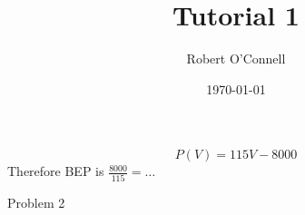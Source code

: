 \documentclass{article}
\title{\textbf{Tutorial 1}}
\author{Robert O'Connell}
\date{\today}
\begin{document}
\maketitle

\begin{problem}
\begin{solution}
	\[
		P(V) = 115V - 8000
	\]
	Therefore BEP is \( \frac{8000}{115} = \ldots  \)
\end{solution}
\end{problem}



\begin{problem}
Problem 2
\end{problem}
\end{document}
